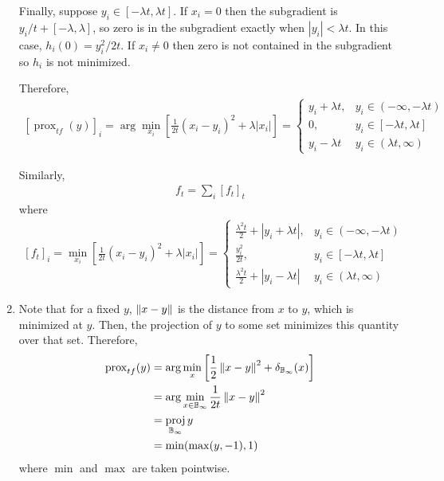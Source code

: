 \documentclass[10pt]{article}
\newcommand{\prox}{\operatorname{prox}}
\DeclareMathOperator*{\proj}{\operatorname{proj}}
\begin{document}
\begin{solution}[Solution]
\begin{enumerate}[label=(\alph*)]
       Finally, suppose \( y_i \in [- \lambda t, \lambda t] \). If \( x_i = 0 \) then the subgradient is \( y_i/t + [-\lambda,\lambda] \), so zero is in the subgradient exactly when \( |y_i| < \lambda t \). In this case, \( h_i(0) = y_i^2/2t \). If \( x_i \neq 0 \) then zero is not contained in the subgradient so \( h_i \) is not minimized.

        Therefore,
        \begin{align*}
            \left[\prox_{tf}(y) \right]_i
            = \arg\min_{x_i} \left[ \frac{1}{2t} (x_i-y_i)^2 + \lambda |x_i| \right]
            = \begin{cases}
                y_i+\lambda t, & y_i\in (-\infty, -\lambda t) \\
                0, & y_i\in[-\lambda t,\lambda t] \\
                y_i-\lambda t & y_i\in(\lambda t,\infty)
            \end{cases}
        \end{align*}
       
        Similarly,
        \begin{align*}
            f_t = \sum_{i} \left[ f_t \right]_t
        \end{align*}
        where
        \begin{align*}
            \left[ f_{t} \right]_i
            = \min_{x_i} \left[ \frac{1}{2t} (x_i-y_i)^2 + \lambda |x_i| \right]
            = \begin{cases}
                \frac{\lambda^2 t}{2} + |y_i+\lambda t|, & y_i\in (-\infty, -\lambda t) \\
                \frac{y_i^2}{2t}, & y_i\in[-\lambda t,\lambda t] \\
                \frac{\lambda^2 t}{2} + |y_i-\lambda t| & y_i\in(\lambda t,\infty)
        \end{cases}
        \end{align*}

        

    \item Note that for a fixed \( y \), \( \left\lVert x-y\right\rVert \) is the distance from \( x \) to \( y \), which is minimized at \( y \). Then, the projection of \( y \) to some set minimizes this quantity over that set. Therefore,
        \begin{align*}
            \prox_{tf}(y) 
            &= \arg\min_x \left[ \frac{1}{2} \norm{x-y}^2 + \delta_{\bB_\infty}(x) \right]
            \\&= \arg\min_{x\in\bB_\infty} \frac{1}{2t}\norm{x-y}^2
            \\&= \proj_{\bB_\infty} y
            \\&= \min (\max( y, -1),1)
        \end{align*}
where \( \min \) and \( \max \) are taken pointwise.


\end{enumerate}
\end{solution}
\end{document}
